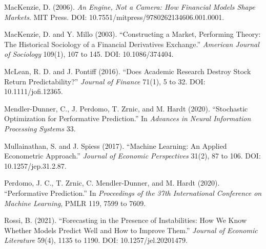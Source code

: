 \documentclass[11pt]{article}
\begin{document}
\begin{small}
MacKenzie, D. (2006). \textit{An Engine, Not a Camera: How Financial Models Shape Markets}. MIT Press. DOI: 10.7551/mitpress/9780262134606.001.0001.

MacKenzie, D. and Y. Millo (2003). ``Constructing a Market, Performing Theory: The Historical Sociology of a Financial Derivatives Exchange.'' \textit{American Journal of Sociology} 109(1), 107 to 145. DOI: 10.1086/374404.

McLean, R. D. and J. Pontiff (2016). ``Does Academic Research Destroy Stock Return Predictability?'' \textit{Journal of Finance} 71(1), 5 to 32. DOI: 10.1111/jofi.12365.

Mendler-Dunner, C., J. Perdomo, T. Zrnic, and M. Hardt (2020). ``Stochastic Optimization for Performative Prediction.'' In \textit{Advances in Neural Information Processing Systems} 33.

Mullainathan, S. and J. Spiess (2017). ``Machine Learning: An Applied Econometric Approach.'' \textit{Journal of Economic Perspectives} 31(2), 87 to 106. DOI: 10.1257/jep.31.2.87.

Perdomo, J. C., T. Zrnic, C. Mendler-Dunner, and M. Hardt (2020). ``Performative Prediction.'' In \textit{Proceedings of the 37th International Conference on Machine Learning}, PMLR 119, 7599 to 7609.

Rossi, B. (2021). ``Forecasting in the Presence of Instabilities: How We Know Whether Models Predict Well and How to Improve Them.'' \textit{Journal of Economic Literature} 59(4), 1135 to 1190. DOI: 10.1257/jel.20201479.
\end{small}
\end{document}
